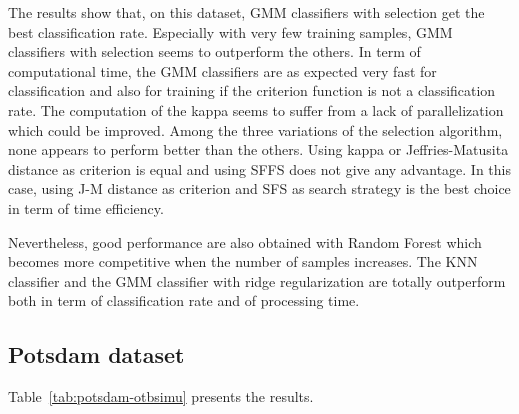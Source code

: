 \documentclass[journal,peerreview,onecolumn]{IEEEtran}
\begin{document}
    The results show that, on this dataset, GMM classifiers with selection get the best classification rate. Especially with very few training samples, GMM classifiers with selection seems to outperform the others. In term of computational time, the GMM classifiers are as expected very fast for classification and also for training if the criterion function is not a classification rate. The computation of the kappa seems to suffer from a lack of parallelization which could be improved. Among the three variations of the selection algorithm, none appears to perform better than the others. Using kappa or Jeffries-Matusita distance as criterion is equal and using SFFS does not give any advantage. In this case, using J-M distance as criterion and SFS as search strategy is the best choice in term of time efficiency.

    Nevertheless, good performance are also obtained with Random Forest which becomes more competitive when the number of samples increases.
    The KNN classifier and the GMM classifier with ridge regularization are totally outperform both in term of classification rate and of processing time.

    \subsection{Potsdam dataset}

    Table~\ref{tab:potsdam-otbsimu} presents the results.

    \begin{table}[!t]
        \centering
        \caption{Results of classification with 1000 samples by class and 5 trials (standard deviation in parenthesis).\label{tab:potsdam-otbsimu}}
    \end{table}
\end{document}
